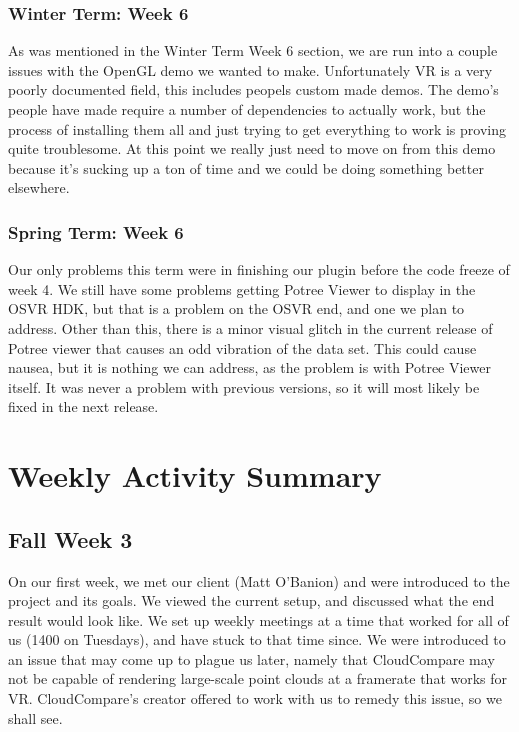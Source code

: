 \documentclass[draftclsnofoot,onecolumn]{IEEEtran}
\begin{document}
\subsubsection{Winter Term: Week 6}

As was mentioned in the Winter Term Week 6 section, we are run into a couple issues with the OpenGL demo we wanted to make.
Unfortunately VR is a very poorly documented field, this includes peopels custom made demos.
The demo's people have made require a number of dependencies to actually work, but the process of installing them all and just trying to get everything to work is proving quite troublesome.
At this point we really just need to move on from this demo because it's sucking up a ton of time and we could be doing something better elsewhere.

\subsubsection{Spring Term: Week 6}

Our only problems this term were in finishing our plugin before the code freeze of week 4. 
We still have some problems getting Potree Viewer to display in the OSVR HDK, but that is a problem on the OSVR end, and one we plan to address. 
Other than this, there is a minor visual glitch in the current release of Potree viewer that causes an odd vibration of the data set. 
This could cause nausea, but it is nothing we can address, as the problem is with Potree Viewer itself. 
It was never a problem with previous versions, so it will most likely be fixed in the next release. 

\section{Weekly Activity Summary}
\subsection{Fall Week 3}

On our first week, we met our client (Matt O'Banion) and were introduced to the project and its goals. 
We viewed the current setup, and discussed what the end result would look like. We set up weekly meetings at a time that worked for all of us (1400 on Tuesdays), and have stuck to that time since. 
We were introduced to an issue that may come up to plague us later, namely that CloudCompare may not be capable of rendering large-scale point clouds at a framerate that works for VR. 
CloudCompare's creator offered to work with us to remedy this issue, so we shall see.
\end{document}
